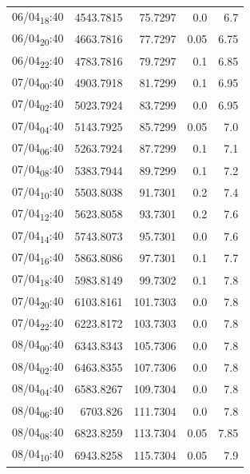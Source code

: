 \documentclass[11pt]{article}
\begin{document}
\begin{center}
\begin{tabular}{lrrrr}
06/04\textsubscript{18}:40 & 4543.7815 & 75.7297 & 0.0 & 6.7\\[0pt]
06/04\textsubscript{20}:40 & 4663.7816 & 77.7297 & 0.05 & 6.75\\[0pt]
06/04\textsubscript{22}:40 & 4783.7816 & 79.7297 & 0.1 & 6.85\\[0pt]
07/04\textsubscript{00}:40 & 4903.7918 & 81.7299 & 0.1 & 6.95\\[0pt]
07/04\textsubscript{02}:40 & 5023.7924 & 83.7299 & 0.0 & 6.95\\[0pt]
07/04\textsubscript{04}:40 & 5143.7925 & 85.7299 & 0.05 & 7.0\\[0pt]
07/04\textsubscript{06}:40 & 5263.7924 & 87.7299 & 0.1 & 7.1\\[0pt]
07/04\textsubscript{08}:40 & 5383.7944 & 89.7299 & 0.1 & 7.2\\[0pt]
07/04\textsubscript{10}:40 & 5503.8038 & 91.7301 & 0.2 & 7.4\\[0pt]
07/04\textsubscript{12}:40 & 5623.8058 & 93.7301 & 0.2 & 7.6\\[0pt]
07/04\textsubscript{14}:40 & 5743.8073 & 95.7301 & 0.0 & 7.6\\[0pt]
07/04\textsubscript{16}:40 & 5863.8086 & 97.7301 & 0.1 & 7.7\\[0pt]
07/04\textsubscript{18}:40 & 5983.8149 & 99.7302 & 0.1 & 7.8\\[0pt]
07/04\textsubscript{20}:40 & 6103.8161 & 101.7303 & 0.0 & 7.8\\[0pt]
07/04\textsubscript{22}:40 & 6223.8172 & 103.7303 & 0.0 & 7.8\\[0pt]
08/04\textsubscript{00}:40 & 6343.8343 & 105.7306 & 0.0 & 7.8\\[0pt]
08/04\textsubscript{02}:40 & 6463.8355 & 107.7306 & 0.0 & 7.8\\[0pt]
08/04\textsubscript{04}:40 & 6583.8267 & 109.7304 & 0.0 & 7.8\\[0pt]
08/04\textsubscript{06}:40 & 6703.826 & 111.7304 & 0.0 & 7.8\\[0pt]
08/04\textsubscript{08}:40 & 6823.8259 & 113.7304 & 0.05 & 7.85\\[0pt]
08/04\textsubscript{10}:40 & 6943.8258 & 115.7304 & 0.05 & 7.9\\[0pt]
\end{tabular}
\end{center}
\end{document}
